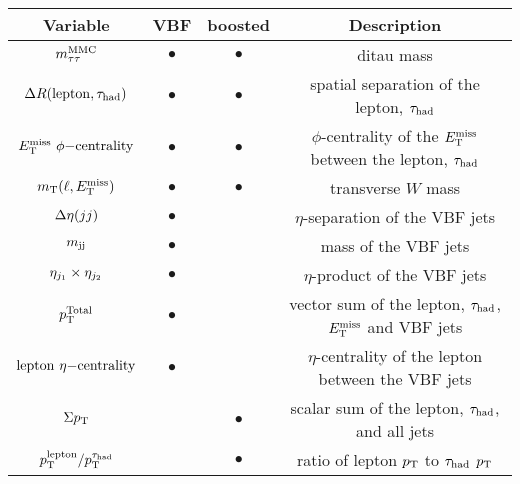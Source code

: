 \begin{tabular}{c|c|c|c}
Variable      & VBF       & boosted   & Description \\ 
\hline
$m_{\tau\tau}^\text{MMC}$       & $\bullet$ & $\bullet$ & ditau mass \\
$\Delta{}R(\mathrm{lepton}, \tau_\text{had})$         & $\bullet$ & $\bullet$ & spatial separation of the lepton, $\tau_\text{had}$ \\
$E_{\mathrm{T}}^{\mathrm{miss}}\ \phi\mathrm{-centrality}$ & $\bullet$ & $\bullet$ & $\phi$-centrality of the $E_{\mathrm{T}}^{\mathrm{miss}}$ between the lepton, $\tau_\text{had}$ \\
$m_\text{T}(\ell, E_{\mathrm{T}}^{\mathrm{miss}})$         & $\bullet$ & $\bullet$ & transverse $W$ mass\\
$\deta$       & $\bullet$ &           & $\eta$-separation of the VBF jets \\
$m_{\text{jj}}$        & $\bullet$ &           & mass of the VBF jets \\
$\etaprod$    & $\bullet$ &           & $\eta$-product of the VBF jets \\ 
$p_\mathrm{T}^{\mathrm{Total}}$      & $\bullet$ &           & vector sum of the lepton, $\tau_\text{had}$, $E_{\mathrm{T}}^{\mathrm{miss}}$ and VBF jets \\
$\lepetacent$ & $\bullet$ &           & $\eta$-centrality of the lepton between the VBF jets \\
$\Sigma p_\mathrm{T}$      &           & $\bullet$ & scalar sum of the lepton, $\tau_\text{had}$, and all jets \\
$p_\mathrm{T}^{\mathrm{lepton}}/p_\mathrm{T}^{\tau_\text{had}}$    &           & $\bullet$ & ratio of lepton $p_{\mathrm{T}}$ to $\tau_\text{had}$ $p_{\mathrm{T}}$ \\
\end{tabular}

